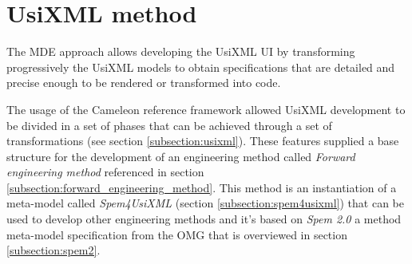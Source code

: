 \section{UsiXML method}
\label{section:usixml_method}

The MDE approach allows developing the UsiXML UI by transforming progressively the UsiXML models to obtain specifications that are detailed and precise enough to be rendered or transformed into code.

The usage of the Cameleon reference framework\cite{Calvary} allowed UsiXML development to be divided in a set of phases that can be achieved through a set of transformations (see section \ref{subsection:usixml}). These features supplied a base structure for the development of an engineering method called \textit{Forward engineering method} referenced in section \ref{subsection:forward_engineering_method}. This method is an instantiation of a meta-model called \textit{Spem4UsiXML} (section \ref{subsection:spem4usixml}) that can be used to develop other engineering methods and it's based on \textit{Spem 2.0} a method meta-model specification from the OMG that is overviewed in section \ref{subsection:spem2}.



